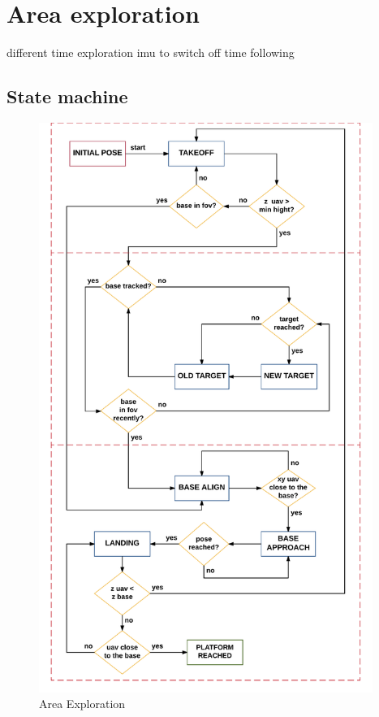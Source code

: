 \chapter{Area exploration}\label{chap:area_exploration}
different time exploration
imu to switch off
time following

\section{State machine}


\begin{figure}[!ht]
    \centering
    \includegraphics[width=0.97\textwidth]{img/area_exploration_state_machine.png}
    \caption{Area Exploration}
    \label{fig:area_exploration_state_machine}
\end{figure}

